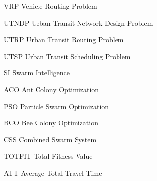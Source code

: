 \begin{abbrv}
\item[VRP] Vehicle Routing Problem
\item[UTNDP] Urban Transit Network Design Problem
\item[UTRP] Urban Transit Routing Problem
\item[UTSP] Urban Transit Scheduling Problem
\item[SI] Swarm Intelligence
\item[ACO] Ant Colony Optimization
\item[PSO] Particle Swarm Optimization
\item[BCO] Bee Colony Optimization
\item[CSS] Combined Swarm System
\item[TOTFIT] Total Fitness Value
\item[ATT] Average Total Travel Time

\end{abbrv}
 
 

 
 
 
 
